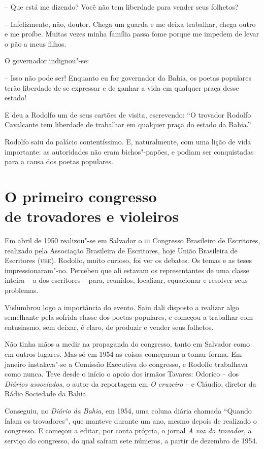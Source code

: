 -- Que está me dizendo? Você não tem liberdade para vender seus
folhetos?

-- Infelizmente, não, doutor. Chega um guarda e me deixa trabalhar,
chega outro e me proíbe. Muitas vezes minha família passa fome porque
me impedem de levar o pão a meus filhos.

O governador indignou"-se:

-- Isso não pode ser! Enquanto eu for governador da Bahia, os poetas
populares terão liberdade de se expressar e de ganhar a vida em
qualquer praça desse estado!

E deu a Rodolfo um de seus cartões de visita, escrevendo:
``O trovador Rodolfo Cavalcante tem liberdade de trabalhar
em qualquer praça do estado da Bahia.''

Rodolfo saiu do palácio contentíssimo. E, naturalmente, com uma lição
de vida importante: as autoridades não eram bichos"-papões, e podiam
ser conquistadas para a causa dos poetas populares.

\section{O primeiro congresso\\ de trovadores e violeiros}

Em abril de 1950 realizou"-se em Salvador o \textsc{iii} Congresso Brasileiro
de Escritores, realizado pela Associação Brasileira de Escritores, hoje
União Brasileira de Escritores (\textsc{ube}). Rodolfo, muito curioso, foi ver
os debates. Os temas e as teses impressionaram"-no. Percebeu que ali
estavam os representantes de uma classe inteira -- a dos escritores
-- para, reunidos, localizar, equacionar e resolver seus problemas.

Vislumbrou logo a importância do evento. Saiu dali disposto a realizar
algo semelhante pela sofrida classe dos poetas populares, e começou a
trabalhar com entusiasmo, sem deixar, é claro, de produzir e vender
seus folhetos.

Não tinha mãos a medir na propaganda do congresso, tanto em Salvador
como em outros lugares. Mas só em 1954 as coisas começaram a tomar
forma. Em janeiro instalava"-se a Comissão Executiva do congresso, e
Rodolfo trabalhava como nunca. Teve desde o início o apoio dos irmãos
Tavares: Odorico -- dos \textit{Diários associados}, o autor da
reportagem em \textit{O cruzeiro} -- e Cláudio, diretor da Rádio
Sociedade da Bahia.

Conseguiu, no \textit{Diário da Bahia}, em 1954, uma coluna diária
chamada ``Quando falam os trovadores'', que
manteve durante um ano, mesmo depois de realizado o congresso. E
começou a editar, por conta própria, o jornal \textit{A voz do
trovador}, a serviço do congresso, do qual saíram sete números, a
partir de dezembro de 1954.

